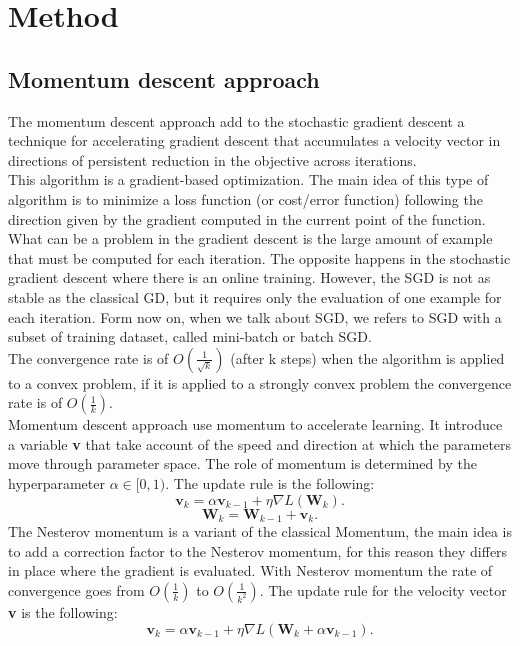 \section{Method}

\subsection{Momentum descent approach}
The momentum descent approach add to the stochastic gradient descent a technique for accelerating gradient descent that accumulates a velocity vector in directions of persistent reduction in the objective across iterations. 
\\
This algorithm is a gradient-based optimization. The main idea of this type of algorithm is to minimize a loss function (or cost/error function) following the direction given by the gradient computed in the current point of the function.
\\
What can be a problem in the gradient descent is the large amount of example that must be computed for each iteration. The opposite happens in the stochastic gradient descent where there is an online training. However, the SGD is not as stable as the classical GD, but it requires only the evaluation of one example for each iteration. 
Form now on, when we talk about SGD, we refers to SGD with a subset of training dataset, called mini-batch or batch SGD.
\\
The convergence rate is of $O(\frac{1}{\sqrt{k}})$ (after k steps) when the algorithm is applied to a convex problem, if it is applied to a strongly convex problem the convergence rate is of $O(\frac{1}{k})$.\\

Momentum descent approach use momentum to accelerate learning. It introduce a variable \textbf{v} that take account of the speed and direction at which the parameters move through parameter space. The role of momentum is determined by the hyperparameter $\alpha\in[0,1)$.
The update rule is the following:
\begin{equation}
\label{classical_momentum}
\textbf{v}_k = \alpha\textbf{v}_{k-1} + \eta\nabla\textit{L}(\textbf{W}_k).
\end{equation}
\begin{equation}
\label{update_momentum}
\textbf{W}_k = \textbf{W}_{k-1}  + \textbf{v}_k.
\end{equation}
The Nesterov momentum is a variant of the classical Momentum, the main idea is to add a correction factor to the Nesterov momentum,  for this reason they differs in place where the gradient is evaluated. With Nesterov momentum the rate of convergence goes from $O(\frac{1}{k})$ to $O(\frac{1}{k^2})$.
The update rule for the velocity vector \textbf{v} is the following:
\begin{equation}
\label{nesterov_momentum}
\textbf{v}_k = \alpha\textbf{v}_{k-1} + \eta\nabla\textit{L}(\textbf{W}_k + \alpha\textbf{v}_{k-1}).
\end{equation}
